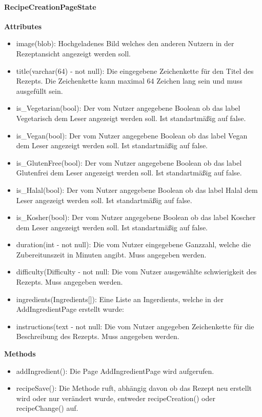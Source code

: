 \documentclass[parskip=full]{scrartcl}
\begin{document}
\paragraph{RecipeCreationPageState}
\textbf{Attributes}
\begin{itemize}
    \item image(blob): Hochgeladenes Bild welches den anderen Nutzern in der Rezeptansicht angezeigt werden soll.
    \item title(varchar(64) - not null): Die eingegebene Zeichenkette für den Titel des Rezepts. Die Zeichenkette kann maximal 64 Zeichen lang sein und muss ausgefüllt sein.
    \item is\_Vegetarian(bool): Der vom Nutzer angegebene Boolean ob das \gls{label} Vegetarisch dem Leser angezeigt werden soll. Ist standartmäßig auf false.
    \item is\_Vegan(bool): Der vom Nutzer angegebene Boolean ob das \gls{label} Vegan dem Leser angezeigt werden soll. Ist standartmäßig auf false.
    \item is\_GlutenFree(bool): Der vom Nutzer angegebene Boolean ob das \gls{label} Glutenfrei dem Leser angezeigt werden soll.  Ist standartmäßig auf false.
    \item is\_Halal(bool): Der vom Nutzer angegebene Boolean ob das \gls{label} Halal dem Leser angezeigt werden soll.  Ist standartmäßig auf false.
    \item is\_Kosher(bool): Der vom Nutzer angegebene Boolean ob das \gls{label} Koscher dem Leser angezeigt werden soll.  Ist standartmäßig auf false.
    \item duration(int - not null): Die vom Nutzer eingegebene Ganzzahl, welche die Zubereitunszeit in Minuten angibt. Muss angegeben werden.
    \item difficulty(Difficulty - not null: Die vom Nutzer ausgewählte \gls{schwierigkeit} des Rezepts. Muss angegeben werden.
    \item ingredients(Ingredients[]): Eine Liste an Ingerdients, welche in der AddIngredientPage erstellt wurde:
    \item instructions(text - not null: Die vom Nutzer angegeben Zeichenkette für die Beschreibung des Rezepts. Muss angegeben werden.
\end{itemize}

\textbf{Methods}
\begin{itemize}
    \item addIngredient(): Die Page AddIngredientPage wird aufgerufen.
    \item recipeSave(): Die Methode ruft, abhängig davon ob das Rezept neu erstellt wird oder nur verändert wurde, entweder recipeCreation() oder recipeChange() auf.
\end{itemize}
\end{document}
